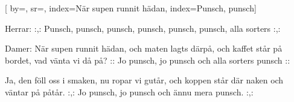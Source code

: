 

[ 		%
	by={},					%
	sr={},					%
	index={När supen runnit hädan}, %
	index={Punsch, punsch}]						%
	

\beginverse*						%
Herrar:
:,: Punsch, punsch,
punsch, punsch,
punsch, punsch,
alla sorters :,:
\endverse							%

\beginverse*						%
Damer:
När supen runnit hädan,
och maten lagts därpå,
och kaffet står på bordet,
vad vänta vi då på?
:: Jo punsch, jo punsch
och alla sorters punsch ::
\endverse							%

\beginverse*						%
Ja, den föll oss i smaken,
nu ropar vi gutår,
och koppen står där naken
och väntar på påtår.
:,: Jo punsch, jo punsch
och ännu mera punsch. :,:
\endverse							%

\endsong							%
